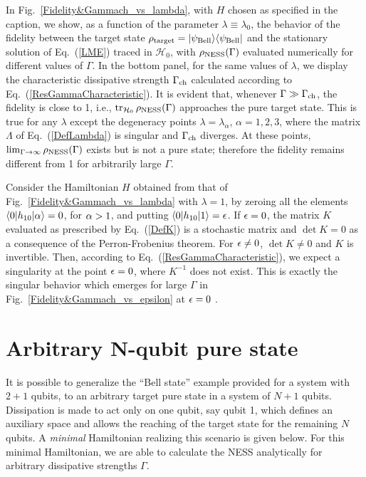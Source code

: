 \documentclass[aps,pra,letterpaper,twocolumn,showpacs,superscriptaddress,floatfix,longbibliography]{revtex4-1}
\newcommand{\traccazero}{\mathop{\mathrm{tr}_{\mathcal{H}_0}}\limits}
\begin{document}
In Fig.~\ref{Fidelity&Gammach_vs_lambda}, with $H$ chosen as specified
in the caption, we show, as a function of the parameter $\lambda
\equiv \lambda_0$, the behavior of the fidelity between the target
state $\rho_{\rm{target}}=
|{\psi_{\rm{Bell}}}\rangle\langle{\psi_{\rm{Bell}}}|$ and the stationary
solution of Eq.~(\ref{LME}) traced in $\mathcal{H}_0$, with
$\rho_{\rm{NESS}}(\Gamma)$ evaluated numerically for different values
of $\Gamma$.  In the bottom panel, for the same values of $\lambda$,
we display the characteristic dissipative strength $\Gamma_{\rm{ch}}$
calculated according to Eq.~(\ref{ResGammaCharacteristic}).  It is
evident that, whenever $\Gamma \gg \Gamma_{\rm{ch}}$, the fidelity is
close to 1, i.e., $\traccazero \rho_{\rm{NESS}}(\Gamma)$ approaches
the pure target state.  This is true for any $\lambda$ except the
degeneracy points $\lambda=\lambda_\alpha$, $\alpha=1,2,3$, where the
matrix $\Lambda$ of Eq.~(\ref{DefLambda}) is singular and
$\Gamma_{\rm{ch}}$ diverges. At these points, $\lim_{\Gamma\to\infty}
\rho_{\rm{NESS}}(\Gamma)$ exists but is not a pure state; therefore
the fidelity remains different from 1 for arbitrarily large $\Gamma$.

Consider the Hamiltonian $H$ obtained from that of
Fig.~\ref{Fidelity&Gammach_vs_lambda} with $\lambda=1$, by zeroing all
the elements $\langle{0}|h_{10}|{\alpha}\rangle=0$, for $\alpha>1$, and putting
$\langle{0}|h_{10}|{1}\rangle=\epsilon$. If $\epsilon=0$, the matrix $K$ evaluated as
prescribed by Eq.~(\ref{DefK}) is a stochastic matrix and $\det K=0$
as a consequence of the Perron-Frobenius theorem.  For $\epsilon\neq 0$,
$\det K \neq 0$ and $K$ is invertible. Then, according to
Eq.~(\ref{ResGammaCharacteristic}), we expect a singularity at the
point $\epsilon=0$, where $K^{-1}$ does not exist. This is exactly the
singular behavior which emerges for large $\Gamma$ in
Fig.~\ref{Fidelity&Gammach_vs_epsilon} at $\epsilon=0$ .




\section{Arbitrary $\bm{N}$-qubit pure state}
It is possible to generalize the ``Bell state'' example provided for a
system with $2+1$ qubits, to an arbitrary target pure state in a
system of $N+1$ qubits.  Dissipation is made to act only on one qubit,
say qubit 1, which defines an auxiliary space and allows the reaching
of the target state for the remaining $N$ qubits.  A \textit{minimal}
Hamiltonian realizing this scenario is given below. For this minimal
Hamiltonian, we are able to calculate the NESS analytically for
arbitrary dissipative strengths $\Gamma$.
\end{document}
